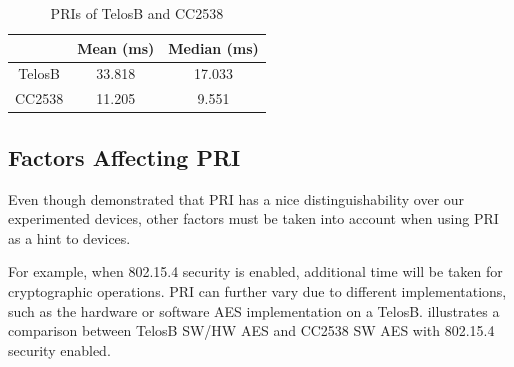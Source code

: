 
\begin{table}[ht!]
	\centering
	{
		\begin{tabular}{|c|c|c|}
			\hline
			              & Mean (ms)     & Median (ms)   \\ \hline
			TelosB & 33.818 & 17.033 \\ \hline
			CC2538 & 11.205  & 9.551 \\ \hline
		\end{tabular}
	}
	\caption{PRIs of TelosB and CC2538}
	\label{PRI_SkyCC2538}
\end{table}


\subsection{Factors Affecting PRI} \label{PingDevice}

Even though  demonstrated that PRI has a nice distinguishability over our experimented devices, other factors must be taken into account when using PRI as a hint to devices. 

For example, when 802.15.4 security\cite{802154} is enabled, additional time will be taken for cryptographic operations. PRI can further vary due to different implementations, such as the hardware or software AES implementation on a TelosB.  illustrates a comparison between TelosB SW/HW AES and CC2538 SW AES with 802.15.4 security enabled. 


